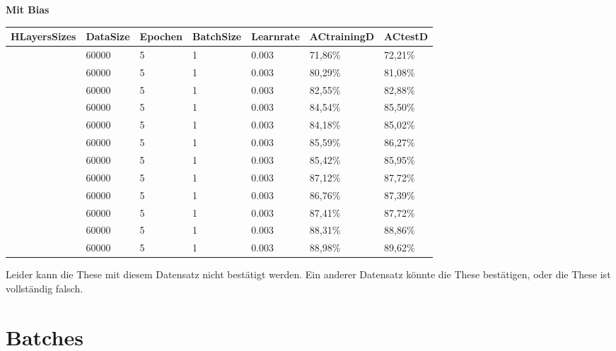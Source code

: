 \documentclass[12pt]{article}
\begin{document}
\begin{table}[H]
    \centering
    \textbf{Mit Bias}
    \begin{tabular}{|l|l|l|l|l|l|l|}
    \hline
        HLayersSizes & DataSize & Epochen & BatchSize & Learnrate & ACtrainingD & ACtestD \\ \hline
        [784, 10, 10] & 60000 & 5 & 1 & 0.003 & 71,86\% & 72,21\% \\ \hline
        [784, 20, 10] & 60000 & 5 & 1 & 0.003 & 80,29\% & 81,08\% \\ \hline
        [784, 30, 10] & 60000 & 5 & 1 & 0.003 & 82,55\% & 82,88\% \\ \hline
        [784, 40, 10] & 60000 & 5 & 1 & 0.003 & 84,54\% & 85,50\% \\ \hline
        [784, 50, 10] & 60000 & 5 & 1 & 0.003 & 84,18\% & 85,02\% \\ \hline
        [784, 60, 10] & 60000 & 5 & 1 & 0.003 & 85,59\% & 86,27\% \\ \hline
        [784, 70, 10] & 60000 & 5 & 1 & 0.003 & 85,42\% & 85,95\% \\ \hline
        [784, 80, 10] & 60000 & 5 & 1 & 0.003 & 87,12\% & 87,72\% \\ \hline
        [784, 90, 10] & 60000 & 5 & 1 & 0.003 & 86,76\% & 87,39\% \\ \hline
        [784, 100, 10] & 60000 & 5 & 1 & 0.003 & 87,41\% & 87,72\% \\ \hline
        [784, 150, 10] & 60000 & 5 & 1 & 0.003 & 88,31\% & 88,86\% \\ \hline
        [784, 200, 10] & 60000 & 5 & 1 & 0.003 & 88,98\% & 89,62\% \\ \hline
    \end{tabular}
\end{table}
Leider kann die These mit diesem Datensatz nicht bestätigt werden. Ein anderer Datensatz könnte die These bestätigen, oder die These ist vollständig falsch.
\section{Batches}
\end{document}
